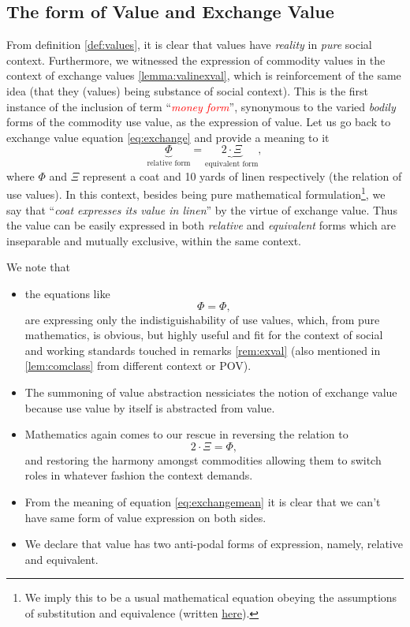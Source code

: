 \documentclass[12pt]{extarticle}
\theoremstyle{definition}
\newenvironment{remark}[1][Remark]{\begin{trivlist}
\item[\hskip \labelsep {\bfseries #1}]}{\end{trivlist}}
\begin{document}
\subsection{The form of Value and Exchange Value}
From definition \ref{def:values}, it is clear that values have \emph{reality} in \emph{pure} social context.  Furthermore, we witnessed the expression of commodity values in the context of exchange values \ref{lemma:valinexval}, which is reinforcement of the same idea (that they (values) being substance of social context).  This is the first instance of the inclusion of term ``\emph{\textcolor{red}{money form}}'', synonymous to the varied \emph{bodily} forms of the commodity use value,  as the expression of value.  Let us go back to exchange value equation \ref{eq:exchange} and provide a meaning to it
\begin{equation}
  \label{eq:exchangemean}
  \underbrace{\Phi}_{\text{relative form}} = \underbrace{2\cdot\Xi}_{\text{equivalent form}},
\end{equation}
where $\Phi$ and $\Xi$ represent a coat and 10 yards of linen respectively (the relation of use values).  In this context, besides being pure mathematical formulation\footnote{We imply this to be a usual mathematical equation obeying the assumptions of substitution and equivalence (written \href{https://en.wikipedia.org/wiki/Equality_(mathematics)\#Basic_properties}{here}).}, we say that ``\emph{coat expresses its value in linen}'' by the virtue of exchange value.  Thus the value can be easily expressed in both \emph{relative} and \emph{equivalent} forms which are inseparable and mutually exclusive, within the same context.

\begin{remark}
  \label{rem:valexchvalform}
  We note that
  \begin{itemize}
\item the equations like
\begin{equation}
  \label{eq:tuto}
  \Phi = \Phi,
\end{equation}
are expressing only the indistiguishability of use values, which, from pure mathematics, is obvious, but highly useful and fit for the context of social and working standards touched in remarks \ref{rem:exval} (also mentioned in \ref{lem:comclass} from different context or POV).
\item The summoning of value abstraction nessiciates the notion of exchange value because use value by itself is abstracted from value.
\item Mathematics again comes to our rescue in reversing the relation to
  \begin{equation}
    2\cdot\Xi = \Phi,
  \end{equation}
  and restoring the harmony amongst commodities allowing them to switch roles in whatever fashion the context demands.
  \item From the meaning of equation \ref{eq:exchangemean} it is clear that we can't have same form of value expression on both sides.
  \item We declare that value has two anti-podal forms of expression, namely, relative and equivalent.
\end{itemize}
\end{remark}
\end{document}
